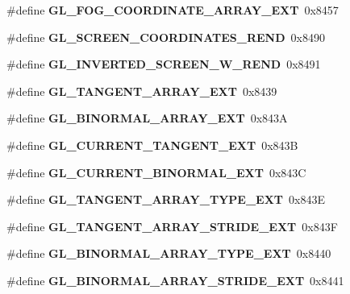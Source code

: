 \begin{DoxyCompactItemize}
\item 
\#define {\bfseries G\+L\+\_\+\+F\+O\+G\+\_\+\+C\+O\+O\+R\+D\+I\+N\+A\+T\+E\+\_\+\+A\+R\+R\+A\+Y\+\_\+\+E\+X\+T}~0x8457\label{_s_d_l__opengl_8h_af219b279d47a5b5dca276c6de0fa74f4}

\item 
\#define {\bfseries G\+L\+\_\+\+S\+C\+R\+E\+E\+N\+\_\+\+C\+O\+O\+R\+D\+I\+N\+A\+T\+E\+S\+\_\+\+R\+E\+N\+D}~0x8490\label{_s_d_l__opengl_8h_afbf3228e066bf5797559a030706d33a9}

\item 
\#define {\bfseries G\+L\+\_\+\+I\+N\+V\+E\+R\+T\+E\+D\+\_\+\+S\+C\+R\+E\+E\+N\+\_\+\+W\+\_\+\+R\+E\+N\+D}~0x8491\label{_s_d_l__opengl_8h_a137115c12d62f2f15ef3000d644b396e}

\item 
\#define {\bfseries G\+L\+\_\+\+T\+A\+N\+G\+E\+N\+T\+\_\+\+A\+R\+R\+A\+Y\+\_\+\+E\+X\+T}~0x8439\label{_s_d_l__opengl_8h_a5b703106e8d58e7020e52640b96e6823}

\item 
\#define {\bfseries G\+L\+\_\+\+B\+I\+N\+O\+R\+M\+A\+L\+\_\+\+A\+R\+R\+A\+Y\+\_\+\+E\+X\+T}~0x843\+A\label{_s_d_l__opengl_8h_a5f68c471aa9e4c4f772a8cf6c0951ff5}

\item 
\#define {\bfseries G\+L\+\_\+\+C\+U\+R\+R\+E\+N\+T\+\_\+\+T\+A\+N\+G\+E\+N\+T\+\_\+\+E\+X\+T}~0x843\+B\label{_s_d_l__opengl_8h_a656b03f364e361640b853e602c561dc2}

\item 
\#define {\bfseries G\+L\+\_\+\+C\+U\+R\+R\+E\+N\+T\+\_\+\+B\+I\+N\+O\+R\+M\+A\+L\+\_\+\+E\+X\+T}~0x843\+C\label{_s_d_l__opengl_8h_ac013c2f179cee5666d01dc0868f78bf9}

\item 
\#define {\bfseries G\+L\+\_\+\+T\+A\+N\+G\+E\+N\+T\+\_\+\+A\+R\+R\+A\+Y\+\_\+\+T\+Y\+P\+E\+\_\+\+E\+X\+T}~0x843\+E\label{_s_d_l__opengl_8h_a184aae825f7d4b33d940c26eae506514}

\item 
\#define {\bfseries G\+L\+\_\+\+T\+A\+N\+G\+E\+N\+T\+\_\+\+A\+R\+R\+A\+Y\+\_\+\+S\+T\+R\+I\+D\+E\+\_\+\+E\+X\+T}~0x843\+F\label{_s_d_l__opengl_8h_aebe4e26601710483a123faca44bedf42}

\item 
\#define {\bfseries G\+L\+\_\+\+B\+I\+N\+O\+R\+M\+A\+L\+\_\+\+A\+R\+R\+A\+Y\+\_\+\+T\+Y\+P\+E\+\_\+\+E\+X\+T}~0x8440\label{_s_d_l__opengl_8h_a61b1c6db5bda6f4d2b97d6a6c1b8b7e7}

\item 
\#define {\bfseries G\+L\+\_\+\+B\+I\+N\+O\+R\+M\+A\+L\+\_\+\+A\+R\+R\+A\+Y\+\_\+\+S\+T\+R\+I\+D\+E\+\_\+\+E\+X\+T}~0x8441\label{_s_d_l__opengl_8h_a19745b108056b9cf6b1c871bd2b8c374}


\end{DoxyCompactItemize}
